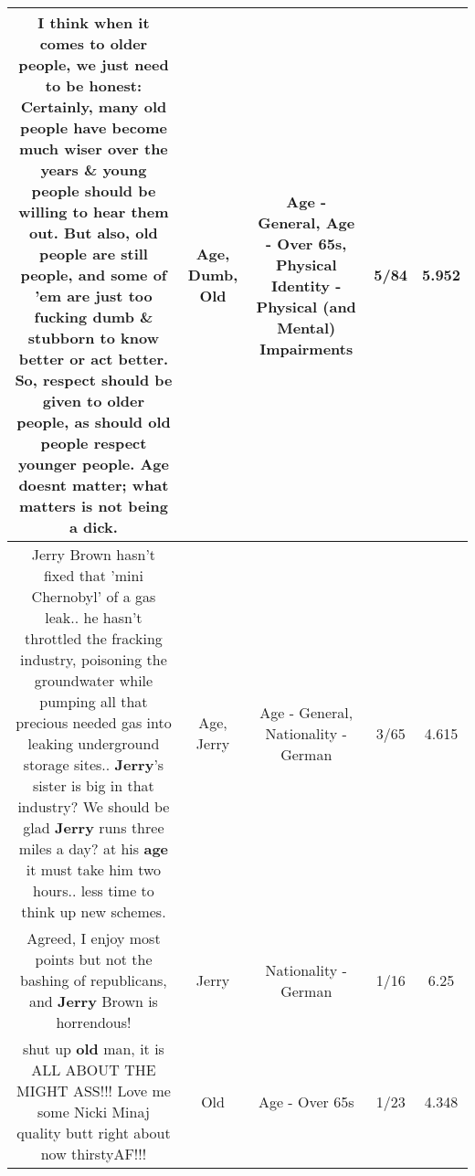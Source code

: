 \documentclass[11pt]{article}
\newlength\mylength
\begin{document}
\begin{center}
\begin{longtable}{|C{.65\mylength}|C{.30\mylength}|C{.12\mylength}|C{.12\mylength}|C{.12\mylength}|}
  \small I think when it comes to older people, we just need to be honest: Certainly, many \textbf{old} people have become much wiser over the years \& young people should be willing to hear them out. But also, \textbf{old} people are still people, and some of 'em are just too fucking \textbf{dumb} \& stubborn to know better or act better. So, respect should be given to older people, as should \textbf{old} people respect younger people. \textbf{Age} doesnt matter; what matters is not being a dick.\normalsize   & Age, Dumb, Old & Age - General, Age - Over 65s, Physical Identity - Physical (and Mental) Impairments & 5/84 & 5.952 \\  \hline
  \small Jerry Brown hasn't fixed that 'mini Chernobyl' of a gas leak.. he hasn't throttled the fracking industry, poisoning the groundwater while pumping all that precious needed gas into leaking underground storage sites.. \textbf{Jerry}'s sister is big in that industry? We should be glad \textbf{Jerry} runs three miles a day? at his \textbf{age} it must take him two hours.. less time to think up new schemes.\normalsize   & Age, Jerry & Age - General, Nationality - German & 3/65 & 4.615 \\  \hline
  \small Agreed, I enjoy most points but not the bashing of republicans, and \textbf{Jerry} Brown is horrendous!\normalsize   & Jerry & Nationality - German & 1/16 & 6.25 \\  \hline
  \small shut up \textbf{old} man, it is ALL ABOUT THE MIGHT ASS!!! Love me some Nicki Minaj quality butt right about now  thirstyAF!!!\normalsize   & Old & Age - Over 65s & 1/23 & 4.348 \\  \hline

\end{longtable}
\end{center}
\end{document}
